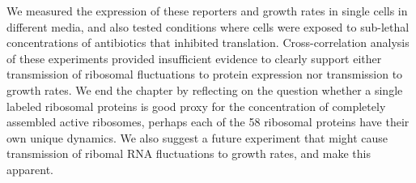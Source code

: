 %
We measured the expression of these reporters and growth rates in single cells in different media, 
and also tested conditions where cells were exposed to sub-lethal concentrations of antibiotics that inhibited translation.
%
Cross-correlation analysis of these experiments 
provided insufficient evidence to clearly support either 
transmission of ribosomal fluctuations to
protein expression
nor transmission to growth rates.
%
We end the chapter by reflecting on the question whether a single labeled ribosomal proteins is good proxy for the concentration of 
completely assembled active ribosomes,
perhaps each of the 58 ribosomal proteins have their own unique dynamics. 
%
We also suggest a future experiment that might cause transmission of ribomal RNA fluctuations to growth rates, and make this apparent.


